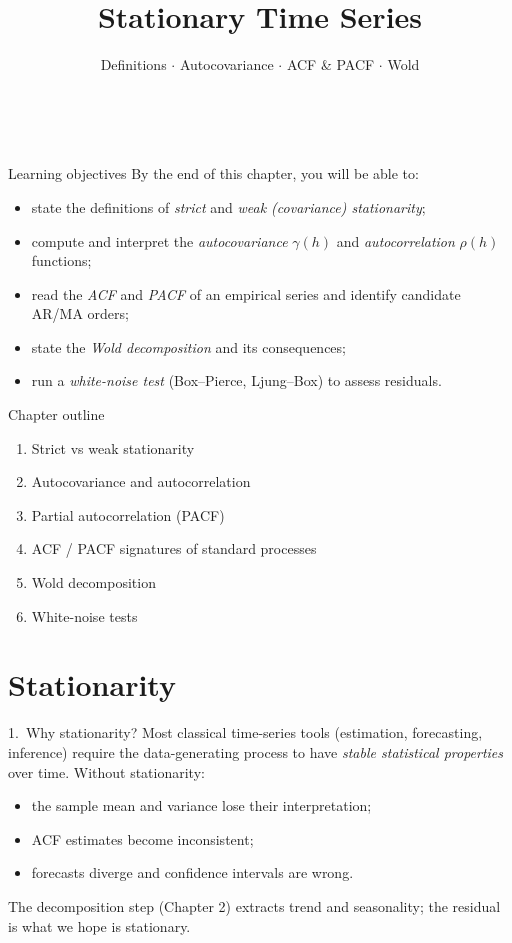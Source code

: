 \documentclass[aspectratio=169]{beamer}
\title[\moduleNom\ -- Ch.3]{Stationary Time Series}
\subtitle{Definitions $\cdot$ Autocovariance $\cdot$ ACF \& PACF $\cdot$ Wold}
\author{\auteurNom \\ \footnotesize\auteurEmail}
\institute{\auteurInstitution}
\date{\anneeUniversitaire}
\begin{document}
\begin{frame}\titlepage\end{frame}

\begin{frame}{Learning objectives}
  By the end of this chapter, you will be able to:
  \begin{itemize}
    \item state the definitions of \emph{strict} and \emph{weak (covariance)
          stationarity};
    \item compute and interpret the \emph{autocovariance}
          $\gamma(h)$ and \emph{autocorrelation} $\rho(h)$ functions;
    \item read the \emph{ACF} and \emph{PACF} of an empirical series
          and identify candidate AR/MA orders;
    \item state the \emph{Wold decomposition} and its consequences;
    \item run a \emph{white-noise test} (Box--Pierce, Ljung--Box) to
          assess residuals.
  \end{itemize}
\end{frame}

\begin{frame}{Chapter outline}
  \begin{enumerate}
    \item Strict vs weak stationarity
    \item Autocovariance and autocorrelation
    \item Partial autocorrelation (PACF)
    \item ACF / PACF signatures of standard processes
    \item Wold decomposition
    \item White-noise tests
  \end{enumerate}
\end{frame}

\section{Stationarity}

\begin{frame}{1.~Why stationarity?}
  Most classical time-series tools (estimation, forecasting,
  inference) require the data-generating process to have
  \emph{stable statistical properties} over time. Without
  stationarity:
  \begin{itemize}
    \item the sample mean and variance lose their interpretation;
    \item ACF estimates become inconsistent;
    \item forecasts diverge and confidence intervals are wrong.
  \end{itemize}
  \medskip
  \begin{infobox}
    The decomposition step (Chapter 2) extracts trend and seasonality;
    the residual is what we hope is stationary.
  \end{infobox}
\end{frame}
\end{document}
